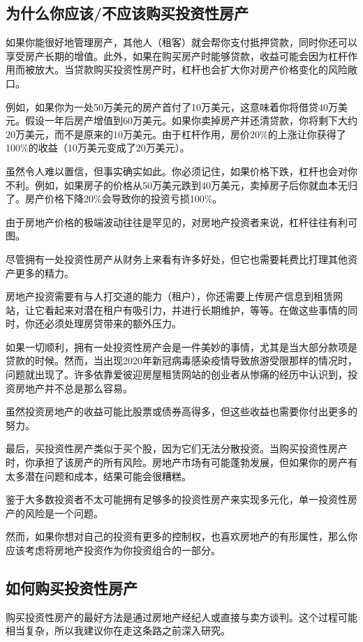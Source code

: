 \subsection{为什么你应该/不应该购买投资性房产}
如果你能很好地管理房产，其他人（租客）就会帮你支付抵押贷款，同时你还可以享受房产长期的增值。此外，如果在购买房产时能够贷款，收益可能会因为杠杆作用而被放大。当贷款购买投资性房产时，杠杆也会扩大你对房产价格变化的风险敞口。

例如，如果你为一处50万美元的房产首付了10万美元，这意味着你将借贷40万美元。假设一年后房产增值到60万美元。如果你卖掉房产并还清贷款，你将剩下大约20万美元，而不是原来的10万美元。由于杠杆作用，房价20\%的上涨让你获得了100\%的收益（10万美元变成了20万美元）。

虽然令人难以置信，但事实确实如此。你必须记住，如果价格下跌，杠杆也会对你不利。例如，如果房子的价格从50万美元跌到40万美元，卖掉房子后你就血本无归了。房产价格下降20\%会导致你的投资亏损100\%。

由于房地产价格的极端波动往往是罕见的，对房地产投资者来说，杠杆往往有利可图。

尽管拥有一处投资性房产从财务上来看有许多好处，但它也需要耗费比打理其他资产更多的精力。

房地产投资需要有与人打交道的能力（租户），你还需要上传房产信息到租赁网站，让它看起来对潜在租户有吸引力，并进行长期维护，等等。在做这些事情的同时，你还必须处理房贷带来的额外压力。

如果一切顺利，拥有一处投资性房产会是一件美妙的事情，尤其是当大部分款项是贷款的时候。然而，当出现2020年新冠病毒感染疫情导致旅游受限那样的情况时，问题就出现了。许多依靠爱彼迎房屋租赁网站的创业者从惨痛的经历中认识到，投资房地产并不总是那么容易。

虽然投资房地产的收益可能比股票或债券高得多，但这些收益也需要你付出更多的努力。

最后，买投资性房产类似于买个股，因为它们无法分散投资。当购买投资性房产时，你承担了该房产的所有风险。房地产市场有可能蓬勃发展，但如果你的房产有太多潜在问题和成本，结果可能会很糟糕。

鉴于大多数投资者不太可能拥有足够多的投资性房产来实现多元化，单一投资性房产的风险是一个问题。

然而，如果你想对自己的投资有更多的控制权，也喜欢房地产的有形属性，那么你应该考虑将房地产投资作为你投资组合的一部分。

\subsection{如何购买投资性房产}
购买投资性房产的最好方法是通过房地产经纪人或直接与卖方谈判。这个过程可能相当复杂，所以我建议你在走这条路之前深入研究。

